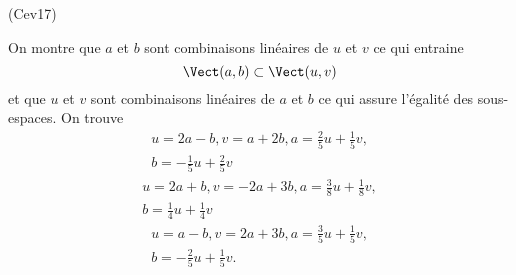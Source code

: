 \begin{tiny}(Cev17)\end{tiny} On montre que $a$ et $b$ sont combinaisons linéaires de $u$ et $v$ ce qui entraine 
\begin{displaymath}
 \Vect(a,b)\subset \Vect(u,v)
\end{displaymath}
et que $u$ et $v$ sont combinaisons linéaires de $a$ et $b$ ce qui assure l'égalité des sous-espaces. On trouve
\begin{multline*}
 u=2a-b, v=a+2b, 
a=\frac{2}{5}u+\frac{1}{5}v,\\ b=-\frac{1}{5}u+\frac{2}{5}v
\end{multline*}
\begin{multline*}
 u=2a+b, v=-2a+3b, 
a=\frac{3}{8}u+\frac{1}{8}v,\\ b=\frac{1}{4}u+\frac{1}{4}v
\end{multline*}
\begin{multline*}
 u=a-b, v=2a+3b, 
a=\frac{3}{5}u+\frac{1}{5}v,\\ b=-\frac{2}{5}u+\frac{1}{5}v .
\end{multline*}
